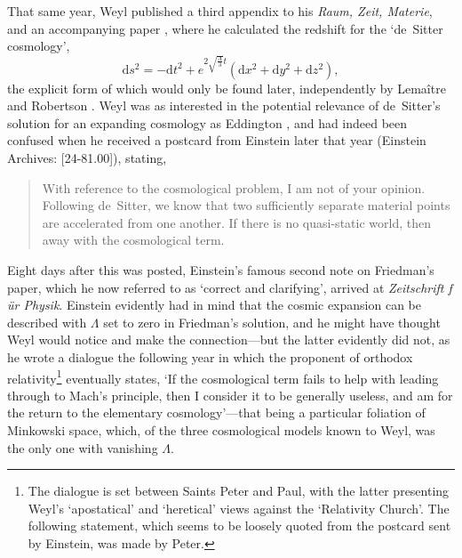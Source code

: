 \documentclass[11pt]{article}
\begin{document}
That same year, Weyl published a third appendix to his \textit{Raum, Zeit, Materie}, and an accompanying paper \cite{Weyl1923}, where he calculated the redshift for the `de~Sitter cosmology', 
\begin{equation}
\mathrm{d}s^2=-\mathrm{d}t^2+e^{2\sqrt{\frac{\Lambda}{3}}t}(\mathrm{d}x^2+\mathrm{d}y^2+\mathrm{d}z^2),\label{dS_LR}
\end{equation}
the explicit form of which would only be found later, independently by Lema\^{i}tre \cite{Lemaitre1925b} and Robertson \cite{Robertson1928}. Weyl was as interested in the potential relevance of de~Sitter's solution for an expanding cosmology as Eddington \cite{Weyl1923}, and had indeed been confused when he received a postcard from Einstein later that year (Einstein Archives: [24-81.00]), stating,
\begin{quotation}
With reference to the cosmological problem, I am not of your opinion. Following de~Sitter, we know that two sufficiently separate material points are accelerated from one another. If there is no quasi-static world, then away with the cosmological term.
\end{quotation}
Eight days after this was posted, Einstein's famous second note \cite{Einstein1923} on Friedman's paper, which he now referred to as `correct and clarifying', arrived at \textit{Zeitschrift f\,\"{u}r Physik}. Einstein evidently had in mind that the cosmic expansion can be described with $\Lambda$ set to zero in Friedman's solution, and he might have thought Weyl would notice \cite{Einstein1923} and make the connection---but the latter evidently did not, as he wrote a dialogue the following year \cite{Weyl1924} in which the proponent of orthodox relativity\footnote{The dialogue is set between Saints Peter and Paul, with the latter presenting Weyl's `apostatical' and `heretical' views against the `Relativity Church'. The following statement, which seems to be loosely quoted from the postcard sent by Einstein, was made by Peter.} eventually states, `If the cosmological term fails to help with leading through to Mach's principle, then I consider it to be generally useless, and am for the return to the elementary cosmology'---that being a particular foliation of Minkowski space, which, of the three cosmological models known to Weyl, was the only one with vanishing $\Lambda$.
\end{document}

